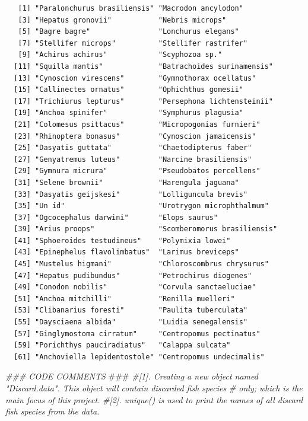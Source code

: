 \documentclass[
]{book}
\newenvironment{Shaded}{\begin{snugshade}}{\end{snugshade}}
\newcommand{\AlertTok}[1]{\textcolor[rgb]{0.94,0.16,0.16}{#1}}
\newcommand{\CommentTok}[1]{\textcolor[rgb]{0.56,0.35,0.01}{\textit{#1}}}
\begin{document}
\begin{verbatim}
   [1] "Paralonchurus brasiliensis" "Macrodon ancylodon"        
   [3] "Hepatus gronovii"           "Nebris microps"            
   [5] "Bagre bagre"                "Lonchurus elegans"         
   [7] "Stellifer microps"          "Stellifer rastrifer"       
   [9] "Achirus achirus"            "Scyphozoa sp."             
  [11] "Squilla mantis"             "Batrachoides surinamensis" 
  [13] "Cynoscion virescens"        "Gymnothorax ocellatus"     
  [15] "Callinectes ornatus"        "Ophichthus gomesii"        
  [17] "Trichiurus lepturus"        "Persephona lichtensteinii" 
  [19] "Anchoa spinifer"            "Symphurus plagusia"        
  [21] "Colomesus psittacus"        "Micropogonias furnieri"    
  [23] "Rhinoptera bonasus"         "Cynoscion jamaicensis"     
  [25] "Dasyatis guttata"           "Chaetodipterus faber"      
  [27] "Genyatremus luteus"         "Narcine brasiliensis"      
  [29] "Gymnura micrura"            "Pseudobatos percellens"    
  [31] "Selene brownii"             "Harengula jaguana"         
  [33] "Dasyatis geijskesi"         "Lolliguncula brevis"       
  [35] "Un id"                      "Urotrygon microphthalmum"  
  [37] "Ogcocephalus darwini"       "Elops saurus"              
  [39] "Arius proops"               "Scomberomorus brasiliensis"
  [41] "Sphoeroides testudineus"    "Polymixia lowei"           
  [43] "Epinephelus flavolimbatus"  "Larimus breviceps"         
  [45] "Mustelus higmani"           "Chloroscombrus chrysurus"  
  [47] "Hepatus pudibundus"         "Petrochirus diogenes"      
  [49] "Conodon nobilis"            "Corvula sanctaeluciae"     
  [51] "Anchoa mitchilli"           "Renilla muelleri"          
  [53] "Clibanarius foresti"        "Paulita tuberculata"       
  [55] "Daysciaena albida"          "Luidia senegalensis"       
  [57] "Ginglymostoma cirratum"     "Centropomus pectinatus"    
  [59] "Porichthys pauciradiatus"   "Calappa sulcata"           
  [61] "Anchoviella lepidentostole" "Centropomus undecimalis"
\end{verbatim}

\begin{Shaded}
\begin{Highlighting}[]
\CommentTok{### CODE COMMENTS }\AlertTok{###}
\CommentTok{#[1]. Creating a new object named "Discard.data". This object will contain discarded fish species}
\CommentTok{#     only; which is the main focus of this project.}
\CommentTok{#[2]. unique() is used to print the names of all discard fish species from the data. }
\end{Highlighting}
\end{Shaded}
\end{document}

